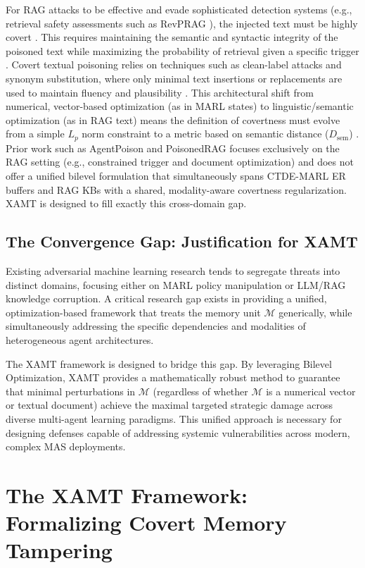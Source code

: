 \documentclass[conference]{IEEEtran}
\begin{document}
For RAG attacks to be effective and evade sophisticated detection systems (e.g., retrieval safety assessments such as RevPRAG \cite{Ref2, Ref37}), the injected text must be highly covert \cite{Ref29}. This requires maintaining the semantic and syntactic integrity of the poisoned text while maximizing the probability of retrieval given a specific trigger \cite{Ref30}. Covert textual poisoning relies on techniques such as clean-label attacks and synonym substitution, where only minimal text insertions or replacements are used to maintain fluency and plausibility \cite{Ref31, Ref32}. This architectural shift from numerical, vector-based optimization (as in MARL states) to linguistic/semantic optimization (as in RAG text) means the definition of covertness must evolve from a simple $L_p$ norm constraint to a metric based on semantic distance ($D_{\text{sem}}$) \cite{Ref29}. Prior work such as AgentPoison and PoisonedRAG focuses exclusively on the RAG setting (e.g., constrained trigger and document optimization) and does not offer a unified bilevel formulation that simultaneously spans CTDE-MARL ER buffers and RAG KBs with a shared, modality-aware covertness regularization. XAMT is designed to fill exactly this cross-domain gap.

\subsection{The Convergence Gap: Justification for XAMT}
Existing adversarial machine learning research tends to segregate threats into distinct domains, focusing either on MARL policy manipulation or LLM/RAG knowledge corruption. A critical research gap exists in providing a unified, optimization-based framework that treats the memory unit $\mathcal{M}$ generically, while simultaneously addressing the specific dependencies and modalities of heterogeneous agent architectures.

The XAMT framework is designed to bridge this gap. By leveraging Bilevel Optimization, XAMT provides a mathematically robust method to guarantee that minimal perturbations in $\mathcal{M}$ (regardless of whether $\mathcal{M}$ is a numerical vector or textual document) achieve the maximal targeted strategic damage across diverse multi-agent learning paradigms. This unified approach is necessary for designing defenses capable of addressing systemic vulnerabilities across modern, complex MAS deployments.

\section{The XAMT Framework: Formalizing Covert Memory Tampering}
\end{document}
